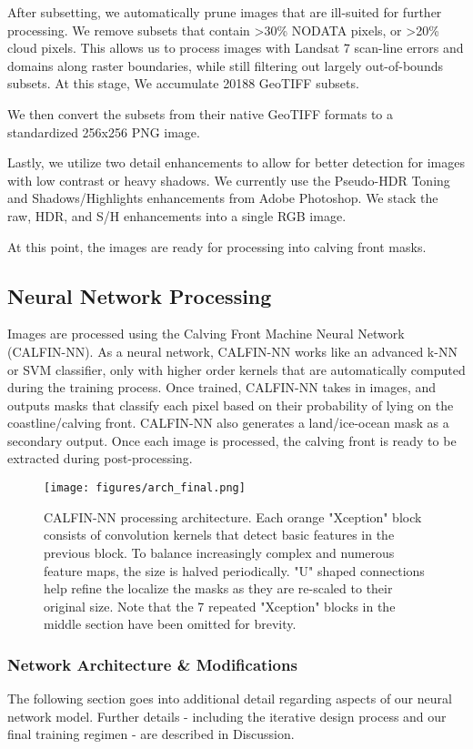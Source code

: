 \documentclass[tc, manuscript]{copernicus}
\begin{document}
After subsetting, we automatically prune images that are ill-suited for further processing. We remove subsets that contain \textgreater30\% NODATA pixels, or \textgreater20\% cloud pixels. This allows us to process images with Landsat 7 scan-line errors and domains along raster boundaries, while still filtering out largely out-of-bounds subsets. At this stage, We accumulate 20188 GeoTIFF subsets.

We then convert the subsets from their native GeoTIFF formats to a standardized 256x256 PNG image.

Lastly, we utilize two detail enhancements to allow for better detection for images with low contrast or heavy shadows. We currently use the Pseudo-HDR Toning and Shadows/Highlights enhancements from Adobe Photoshop. We stack the raw, HDR, and S/H enhancements into a single RGB image. 

At this point, the images are ready for processing into calving front masks.

\subsection{Neural Network Processing}
\label{sec:proc}
Images are processed using the Calving Front Machine Neural Network (CALFIN-NN). As a neural network, CALFIN-NN works like an advanced k-NN or SVM classifier, only with higher order kernels that are automatically computed during the training process. Once trained, CALFIN-NN takes in images, and outputs masks that classify each pixel based on their probability of lying on the coastline/calving front. CALFIN-NN also generates a land/ice-ocean mask as a secondary output. Once each image is processed, the calving front is ready to be extracted during post-processing.

\begin{figure}[h]
    \texttt{[image: figures/arch\_final.png]}
    \centering
    \caption{CALFIN-NN processing architecture. Each orange "Xception" block consists of convolution kernels that detect basic features in the previous block. To balance increasingly complex and numerous feature maps, the size is halved periodically. "U" shaped connections help refine the localize the masks as they are re-scaled to their original size. Note that the 7 repeated "Xception" blocks in the middle section have been omitted for brevity.}
    \label{fig:NNarch}
\end{figure}

\subsubsection{Network Architecture \& Modifications}
\label{sec:arch}
The following section goes into additional detail regarding aspects of our neural network model. Further details - including the iterative design process and our final training regimen - are described in Discussion. 
\end{document}
